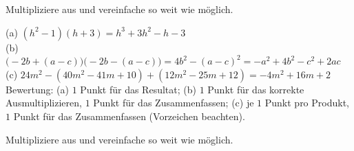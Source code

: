 \documentclass[11pt]{exam}
\begin{document}
\begin{questions}
{
	}

\noaddpoints
\question[\totalpoints] %
\addpoints
Multipliziere aus und vereinfache so weit wie möglich.
{\begin{solution}
	(a) $(h^2-1)(h+3)=h^3+3h^2-h-3$\\
	(b) $\bigl(-2b+(a-c)\bigr)\bigl(-2b-(a-c)\bigr)=4b^2-(a-c)^2=-a^2+4b^2-c^2+2ac$\\
	(c) $24m^2-(40m^2-41m+10)+(12m^2-25m+12)=-4m^2+16m+2$\\
	Bewertung: (a) $1$ Punkt für das Resultat; (b) $1$ Punkt für das korrekte Ausmultiplizieren, $1$ Punkt für das Zusammenfassen; (c) je $1$ Punkt pro Produkt, $1$ Punkt für das Zusammenfassen (Vorzeichen beachten).
\end{solution}}
{}

\noaddpoints
\question[\totalpoints] %
\addpoints
Multipliziere aus und vereinfache so weit wie möglich.
\end{questions}
\end{document}
